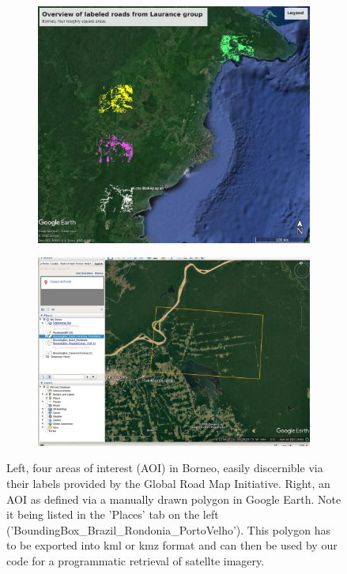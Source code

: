 \documentclass[12pt,a4paper]{scrartcl}
\begin{document}
\begin{figure}
	\begin{subfigure}{0.46\textwidth}
		\includegraphics[width=0.88\linewidth]{GE_overview_areas_Borneo.jpg}
	\end{subfigure} 
	\begin{subfigure}{0.5\textwidth}
		\includegraphics[width=0.99\linewidth]{Screenshot_AOI_example.jpg}
	\end{subfigure} 
	\caption{Left, four areas of interest (AOI) in Borneo, easily discernible via their labels provided by the Global Road Map Initiative. Right, an AOI as defined via a manually drawn polygon in Google Earth. Note it being listed in the 'Places' tab on the left ('BoundingBox\_Brazil\_Rondonia\_PortoVelho'). This polygon has to be exported into kml or kmz format and can then be used by our code for a programmatic retrieval of satellte imagery.}
	\label{fig:aoi}
\end{figure}
\end{document}
